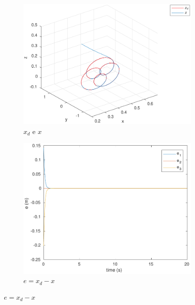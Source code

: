 \documentclass[a4paper,11pt]{article}
\theoremstyle{mytheor}
\begin{document}
\begin{figure}[!ht]
\centering
  \begin{minipage}{\linewidth}
  \centering
    \begin{subfigure}[b]{0.4\textwidth}
    \includegraphics[width=1\textwidth]{figs/ex1_a_1_x.pdf}
    \caption{$x_d$ e $x$}
    \label{fig:ex1_a_1_x}
    \end{subfigure}
  \end{minipage}
  \begin{minipage}{\linewidth}
  \centering
    \begin{subfigure}[b]{0.4\textwidth}
    \includegraphics[width=1\textwidth]{figs/ex1_a_1_e.pdf}
    \caption{$e = x_d - x$}
    \label{fig:ex1_a_1_e}

\end{subfigure}
\end{minipage}
\end{figure}
\end{document}
